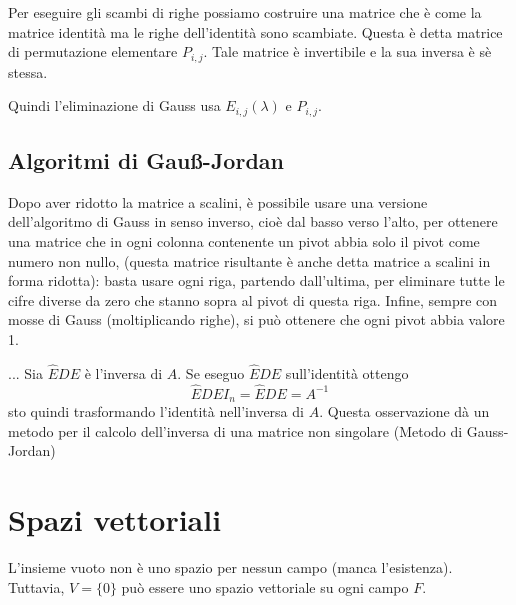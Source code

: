 \documentclass[a4paper]{article}
\begin{document}
Per eseguire gli scambi di righe possiamo costruire una matrice che è come la matrice
identità ma le righe dell'identità sono scambiate.
Questa è detta matrice di permutazione elementare \(P_{i,j}\).
Tale matrice è invertibile e la sua inversa è sè stessa.

Quindi l'eliminazione di Gauss usa \(E_{i,j}(\lambda)\) e \(P_{i,j}\).

\subsection{Algoritmi di Gauß-Jordan}

Dopo aver ridotto la matrice a scalini, è possibile usare una versione dell'algoritmo di
Gauss in senso inverso, cioè dal basso verso l'alto,
per ottenere una matrice che in ogni colonna contenente un pivot abbia solo il pivot come
numero non nullo, (questa matrice risultante è anche detta matrice a scalini in forma ridotta):
basta usare ogni riga, partendo dall'ultima, per eliminare tutte le
cifre diverse da zero che stanno sopra al pivot di questa riga.
Infine, sempre con mosse di Gauss (moltiplicando righe),
si può ottenere che ogni pivot abbia valore 1.

... Sia \(\hat{E}DE\) è l'inversa di \(A\). Se eseguo \(\hat{E}DE\) sull'identità ottengo
\[
    \hat{E}DEI_n = \hat{E}DE = A^{-1}
\]
sto quindi trasformando l'identità nell'inversa di \(A\).
Questa osservazione dà un metodo per il calcolo dell'inversa di una matrice non singolare
(Metodo di Gauss-Jordan)



\section{Spazi vettoriali}

L'insieme vuoto non è uno spazio per nessun campo (manca l'esistenza).
Tuttavia, \(V = \{0\}\) può essere uno spazio vettoriale su ogni campo \(F\).

\end{document}
